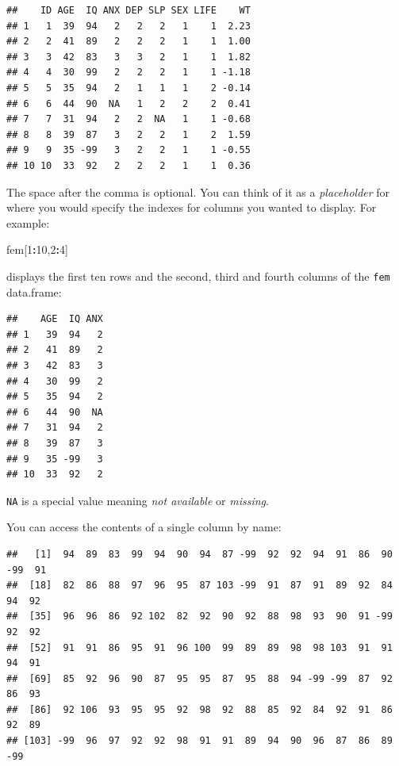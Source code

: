 \documentclass[]{book}
\newenvironment{Shaded}{\begin{snugshade}}{\end{snugshade}}
\newcommand{\DecValTok}[1]{\textcolor[rgb]{0.00,0.00,0.81}{#1}}
\newcommand{\OperatorTok}[1]{\textcolor[rgb]{0.81,0.36,0.00}{\textbf{#1}}}
\newcommand{\NormalTok}[1]{#1}
\theoremstyle{definition}
\theoremstyle{definition}
\theoremstyle{definition}
\theoremstyle{remark}
\begin{document}
\begin{verbatim}
##    ID AGE  IQ ANX DEP SLP SEX LIFE    WT
## 1   1  39  94   2   2   2   1    1  2.23
## 2   2  41  89   2   2   2   1    1  1.00
## 3   3  42  83   3   3   2   1    1  1.82
## 4   4  30  99   2   2   2   1    1 -1.18
## 5   5  35  94   2   1   1   1    2 -0.14
## 6   6  44  90  NA   1   2   2    2  0.41
## 7   7  31  94   2   2  NA   1    1 -0.68
## 8   8  39  87   3   2   2   1    2  1.59
## 9   9  35 -99   3   2   2   1    1 -0.55
## 10 10  33  92   2   2   2   1    1  0.36
\end{verbatim}

The space after the comma is optional. You can think of it as a
\emph{placeholder} for where you would specify the indexes for columns
you wanted to display. For example:

\begin{Shaded}
\begin{Highlighting}[]
\NormalTok{fem[}\DecValTok{1}\OperatorTok{:}\DecValTok{10}\NormalTok{,}\DecValTok{2}\OperatorTok{:}\DecValTok{4}\NormalTok{]}
\end{Highlighting}
\end{Shaded}

displays the first ten rows and the second, third and fourth columns of
the \texttt{fem} data.frame:

\begin{verbatim}
##    AGE  IQ ANX
## 1   39  94   2
## 2   41  89   2
## 3   42  83   3
## 4   30  99   2
## 5   35  94   2
## 6   44  90  NA
## 7   31  94   2
## 8   39  87   3
## 9   35 -99   3
## 10  33  92   2
\end{verbatim}

\texttt{NA} is a special value meaning \emph{not available} or
\emph{missing}.

You can access the contents of a single column by name:

\begin{Shaded}
\end{Shaded}

\begin{verbatim}
##   [1]  94  89  83  99  94  90  94  87 -99  92  92  94  91  86  90 -99  91
##  [18]  82  86  88  97  96  95  87 103 -99  91  87  91  89  92  84  94  92
##  [35]  96  96  86  92 102  82  92  90  92  88  98  93  90  91 -99  92  92
##  [52]  91  91  86  95  91  96 100  99  89  89  98  98 103  91  91  94  91
##  [69]  85  92  96  90  87  95  95  87  95  88  94 -99 -99  87  92  86  93
##  [86]  92 106  93  95  95  92  98  92  88  85  92  84  92  91  86  92  89
## [103] -99  96  97  92  92  98  91  91  89  94  90  96  87  86  89 -99
\end{verbatim}
\end{document}

